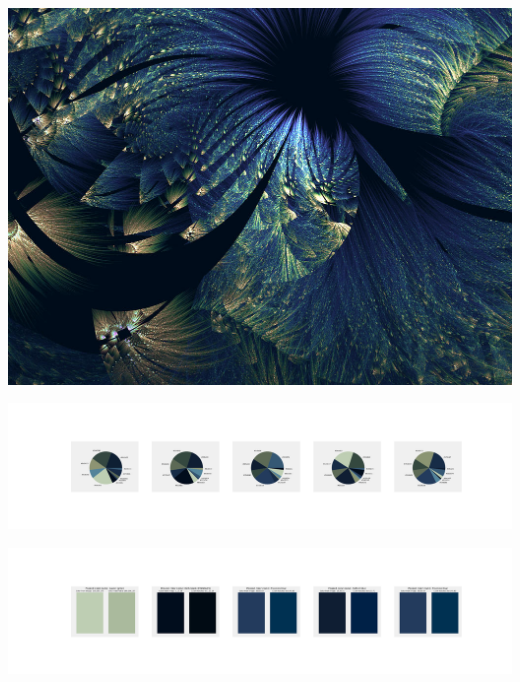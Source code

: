 \documentclass[11pt]{article}
\begin{document}
\begin{landscape}
    \begin{center}
    \includegraphics[width=\textwidth]{./nbimg/file (212).jpg}
    \end{center}

    \begin{center}
    \includegraphics[width=250mm]{./nbimg/pie-126.jpg}
    \end{center}

    \begin{center}
    \includegraphics[width=250mm]{./nbimg/peak-126.jpg}
    \end{center}
    


\end{landscape}
\end{document}
